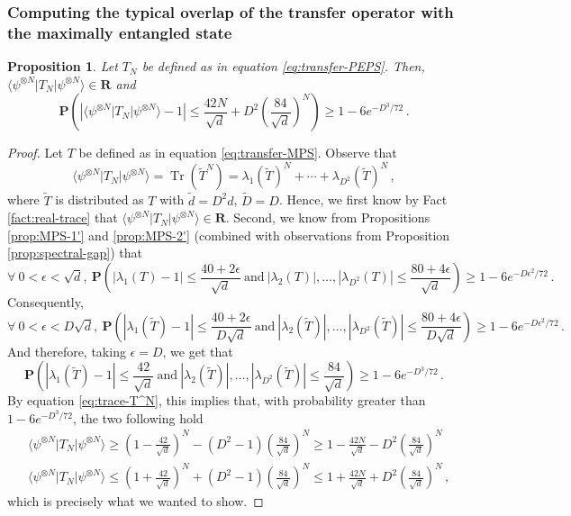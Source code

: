 \documentclass{amsart}
\newtheorem{proposition}[theorem]{Proposition}
\newcommand{\R}{\mathbf{R}}
\renewcommand{\P}{\mathbf{P}}
\renewcommand{\leq}{\leqslant}
\renewcommand{\geq}{\geqslant}
\DeclareMathOperator{\Tr}{Tr}
\newcommand{\bra}[1]{\langle #1 |}
\newcommand{\ket}[1]{| #1 \rangle}
\begin{document}
\subsubsection{Computing the typical overlap of the transfer operator with the maximally entangled state} \hfill\par\smallskip

\begin{proposition} \label{prop:PEPS-1}
    Let $T_N$ be defined as in equation \eqref{eq:transfer-PEPS}. Then, $\bra{\psi^{\otimes N}}T_N\ket{\psi^{\otimes N}}\in\R$ and
    \[ \P\left( \left| \bra{\psi^{\otimes N}}T_N\ket{\psi^{\otimes N}} - 1 \right| \leq \frac{42N}{\sqrt{d}}+D^2\left(\frac{84}{\sqrt{d}}\right)^N \right) \geq 1-6e^{-D^3/72} \, . \]
\end{proposition}

\begin{proof}
    Let $T$ be defined as in equation \eqref{eq:transfer-MPS}. Observe that
    \begin{equation} \label{eq:trace-T^N}
        \bra{\psi^{\otimes N}}T_N\ket{\psi^{\otimes N}}=\Tr\left(\tilde{T}^N\right) = \lambda_1(\tilde{T})^N+\cdots+ \lambda_{D^2}(\tilde{T})^N \, ,
    \end{equation}
    where $\tilde{T}$ is distributed as $T$ with $\tilde{d}=D^2d$, $\tilde{D}=D$. Hence, we first know by Fact \ref{fact:real-trace} that $\bra{\psi^{\otimes N}}T_N\ket{\psi^{\otimes N}}\in\R$. Second, we know from Propositions \ref{prop:MPS-1'} and \ref{prop:MPS-2'} (combined with observations from Proposition \ref{prop:spectral-gap}) that
    \[ \forall\ 0<\epsilon<\sqrt{d},\ \P\left( \left| \lambda_1(T) - 1 \right| \leq \frac{40+2\epsilon}{\sqrt{d}}\ \text{and}\ |\lambda_2(T)|,\ldots,|\lambda_{D^2}(T)|\leq \frac{80+4\epsilon}{\sqrt{d}} \right) \geq 1-6e^{-D\epsilon^2/72} \, .  \]
    Consequently,
    \[ \forall\ 0<\epsilon<D\sqrt{d},\ \P\left( \left| \lambda_1(\tilde{T})-1 \right|\leq \frac{40+2\epsilon}{D\sqrt{d}}\ \text{and}\ \left|\lambda_2(\tilde{T})\right|,\ldots,\left|\lambda_{D^2}(\tilde{T})\right|\leq \frac{80+4\epsilon}{D\sqrt{d}} \right) \geq 1-6e^{-D\epsilon^2/72} \, .  \]
    And therefore, taking $\epsilon=D$, we get that
    \[ \P\left( \left| \lambda_1(\tilde{T})-1 \right|\leq \frac{42}{\sqrt{d}}\ \text{and}\ \left|\lambda_2(\tilde{T})\right|,\ldots,\left|\lambda_{D^2}(\tilde{T})\right|\leq \frac{84}{\sqrt{d}} \right) \geq 1-6e^{-D^3/72} \, .  \]
    By equation \eqref{eq:trace-T^N}, this implies that, with probability greater than $1-6e^{-D^3/72}$, the two following hold
    \begin{align*}
         & \bra{\psi^{\otimes N}}T_N\ket{\psi^{\otimes N}} \geq \left(1-\frac{42}{\sqrt{d}}\right)^N - (D^2-1)\left(\frac{84}{\sqrt{d}}\right)^N \geq 1- \frac{42N}{\sqrt{d}}-D^2\left(\frac{84}{\sqrt{d}}\right)^N       \\
         & \bra{\psi^{\otimes N}}T_N\ket{\psi^{\otimes N}} \leq \left(1+\frac{42}{\sqrt{d}}\right)^N + (D^2-1)\left(\frac{84}{\sqrt{d}}\right)^N \leq 1 + \frac{42N}{\sqrt{d}}+D^2\left(\frac{84}{\sqrt{d}}\right)^N \, ,
    \end{align*}
    which is precisely what we wanted to show.
\end{proof}
\end{document}
